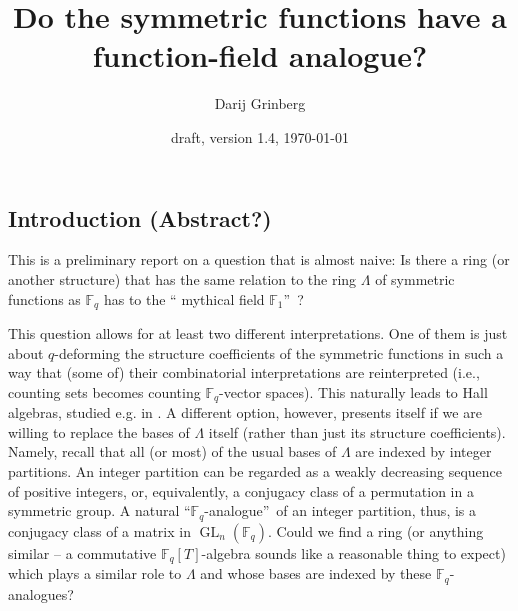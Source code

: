 \documentclass[numbers=enddot,12pt,final,onecolumn,notitlepage]{scrartcl}%
\theoremstyle{definition}
\begin{document}
\title{Do the symmetric functions have a function-field analogue?}
\author{Darij Grinberg}
\date{draft, version 1.4,
\today
}
\maketitle
\tableofcontents

\subsection{Introduction (Abstract?)}

This is a preliminary report on a question that is almost naive: Is there a
ring (or another structure) that has the same relation to the ring $\Lambda$
of symmetric functions as $\mathbb{F}_{q}$ has to the \textquotedblleft
mythical field $\mathbb{F}_{1}$\textquotedblright\ ?

This question allows for at least two different interpretations. One of them
is just about $q$-deforming the structure coefficients of the symmetric
functions in such a way that (some of) their combinatorial interpretations are
reinterpreted (i.e., counting sets becomes counting $\mathbb{F}_{q}$-vector
spaces). This naturally leads to Hall algebras, studied e.g. in
\cite{dyckerhoff}. A different option, however, presents itself if we are
willing to replace the bases of $\Lambda$ itself (rather than just its
structure coefficients). Namely, recall that all (or most) of the usual bases
of $\Lambda$ are indexed by integer partitions. An integer partition can be
regarded as a weakly decreasing sequence of positive integers, or,
equivalently, a conjugacy class of a permutation in a symmetric group. A
natural \textquotedblleft$\mathbb{F}_{q}$-analogue\textquotedblright\ of an
integer partition, thus, is a conjugacy class of a matrix in
$\operatorname*{GL}\nolimits_{n}\left(  \mathbb{F}_{q}\right)  $. Could we
find a ring (or anything similar -- a commutative $\mathbb{F}_{q}\left[
T\right]  $-algebra sounds like a reasonable thing to expect) which plays a
similar role to $\Lambda$ and whose bases are indexed by these $\mathbb{F}%
_{q}$-analogues?
\end{document}
